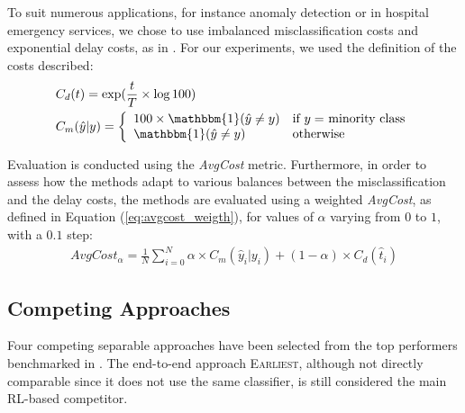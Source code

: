 \documentclass[sigconf, nonacm, table]{acmart}
\begin{document}
To suit numerous applications, for instance anomaly detection or in hospital emergency services, we chose to use imbalanced misclassification costs and exponential delay costs,  as in \cite{renault2024early}. 
For our experiments, we used the definition of the costs described:
\begin{align}
    &C_d(t) = \exp( \frac{t}{T} \times \log100) \\
    &C_m(\hat{y}|y) = \left\{ 
    \begin{array}{ll}
          100 \times \mathbbm{1}(\hat{y} \neq y) & \mbox{if $y=$  minority class}   \\
         \mathbbm{1}(\hat{y} \neq y) & \mbox{otherwise}
    \end{array}
    \right.
\end{align}

Evaluation is conducted using the \textit{AvgCost} metric. Furthermore, in order to assess how the methods adapt to various balances between the misclassification and the delay costs, 
the methods are evaluated using a weighted \textit{AvgCost}, as defined in Equation (\ref{eq:avgcost_weigth}), for values of  $\alpha$ varying from $0$ to $1$, with a $0.1$ step: 
\begin{align}
    AvgCost_{\alpha} = \frac{1}{N} \sum_{i=0}^{N} \alpha \times C_m(\hat{y}_i|y_i) + (1 - \alpha) \times C_d(\hat{t}_i)
    \label{eq:avgcost_weigth}
\end{align}




\subsection{Competing Approaches}




Four competing separable approaches have been selected from the top performers benchmarked in \cite{renault2024early}. The end-to-end approach \textsc{Earliest}, although not directly comparable since it does not use the same classifier, is still considered the main RL-based competitor.
\end{document}
